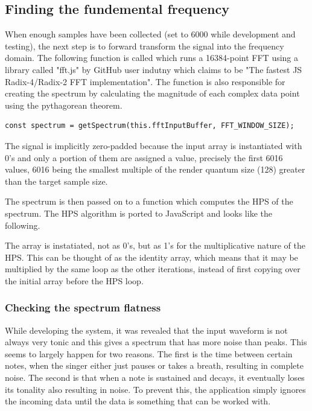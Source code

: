 \subsection{Finding the fundemental frequency}
When enough samples have been collected (set to 6000 while development and testing), the next step is to forward transform the signal into the frequency domain. The following function is called which runs a 16384-point FFT using a library called "fft.js" by GitHub user indutny which claims to be "The fastest JS Radix-4/Radix-2 FFT implementation". The function is also responsible for creating the spectrum by calculating the magnitude of each complex data point using the pythagorean theorem. 
\begin{lstlisting}[style=javascript]
    const spectrum = getSpectrum(this.fftInputBuffer, FFT_WINDOW_SIZE);
\end{lstlisting}
The signal is implicitly zero-padded because the input array is instantiated with 0's and only a portion of them are assigned a value, precisely the first 6016 values, 6016 being the smallest multiple of the render quantum size (128) greater than the target sample size.

The spectrum is then passed on to a function which computes the HPS of the spectrum. The HPS algorithm is ported to JavaScript and looks like the following. 

The array is instatiated, not as 0's, but as 1's for the multiplicative nature of the HPS. This can be thought of as the identity array, which means that it may be multiplied by the same loop as the other iterations, instead of first copying over the initial array before the HPS loop.

\subsubsection{Checking the spectrum flatness}
While developing the system, it was revealed that the input waveform is not always very tonic and this gives a spectrum that has more noise than peaks. This seems to largely happen for two reasons. The first is the time between certain notes, when the singer either just pauses or takes a breath, resulting in complete noise. The second is that when a note is sustained and decays, it eventually loses its tonality also resulting in noise. To prevent this, the application simply ignores the incoming data until the data is something that can be worked with. 

